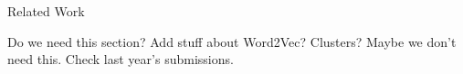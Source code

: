 

\begin{section}{Related Work}

Do we need this section?
Add stuff about Word2Vec? Clusters? Maybe we don't need this. Check last year's submissions.

\end{section}
